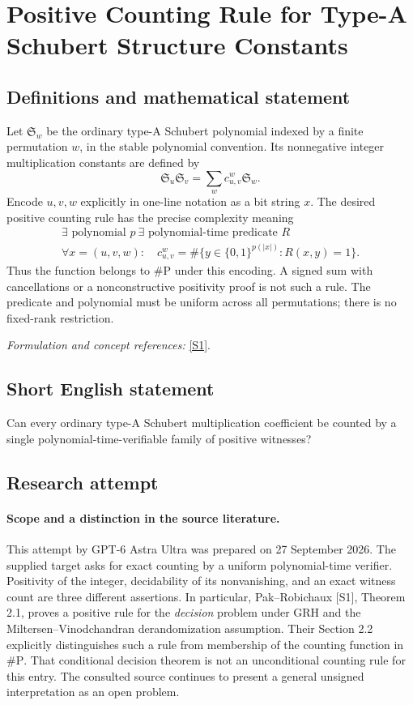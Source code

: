 \documentclass[11pt]{article}
\begin{document}
\section*{\texorpdfstring{Positive Counting Rule for Type-A Schubert Structure Constants}{Positive Counting Rule for Type-A Schubert Structure Constants}}\label{30006968}
\subsection{Definitions and mathematical statement}
Let $\mathfrak S_w$ be the ordinary type-A Schubert polynomial indexed by a finite permutation $w$, in the stable polynomial convention. Its nonnegative integer multiplication constants are defined by
\[
 \mathfrak S_u\mathfrak S_v=\sum_w c_{u,v}^{w}\mathfrak S_w.
\]
Encode $u,v,w$ explicitly in one-line notation as a bit string $x$. The desired positive counting rule has the precise complexity meaning
\[
 \begin{gathered}
 \exists\text{ polynomial }p\ \exists\text{ polynomial-time predicate }R\\
 \forall x=(u,v,w):\quad
 c_{u,v}^{w}=\#\{y\in\{0,1\}^{p(|x|)}:R(x,y)=1\}.
 \end{gathered}
\]
Thus the function belongs to $\#\mathrm P$ under this encoding. A signed sum with cancellations or a nonconstructive positivity proof is not such a rule. The predicate and polynomial must be uniform across all permutations; there is no fixed-rank restriction.
\par\smallskip\textit{Formulation and concept references:} \href{https://arxiv.org/html/2412.18984}{[S1]}.

\subsection{Short English statement}
Can every ordinary type-A Schubert multiplication coefficient be counted by a single polynomial-time-verifiable family of positive witnesses?
\subsection{Research attempt}
\paragraph{Scope and a distinction in the source literature.}
This attempt by GPT-6 Astra Ultra was prepared on 27 September 2026.
The supplied target asks for exact counting by a uniform polynomial-time
verifier. Positivity of the integer, decidability of its nonvanishing, and
an exact witness count are three different assertions. In particular,
Pak--Robichaux [S1], Theorem 2.1, proves a positive rule for the
\emph{decision} problem under GRH and the Miltersen--Vinodchandran
derandomization assumption. Their Section 2.2 explicitly distinguishes
such a rule from membership of the counting function in $\#\mathrm P$.
That conditional decision theorem is not an unconditional counting rule
for this entry. The consulted source continues to present a general
unsigned interpretation as an open problem.
\end{document}
